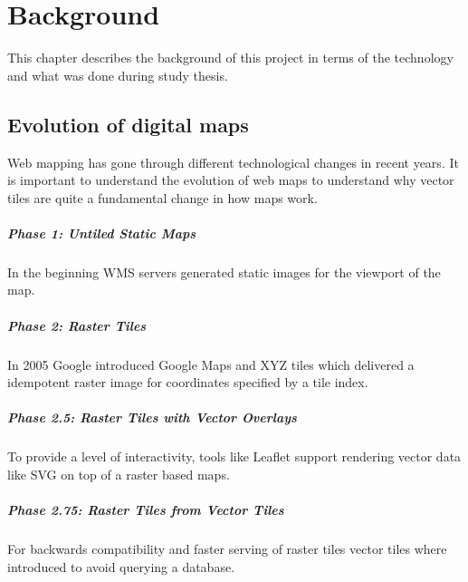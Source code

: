 \chapter{Background}

This chapter describes the background of this project in terms of the technology and what was done during study thesis.

\section{Evolution of digital maps}\label{part1_evolution_of_digital_maps}

Web mapping has gone through different technological changes in recent years. It is important to understand the evolution of web maps to understand why vector tiles are quite a fundamental change in how maps work.

\paragraph{Phase 1: Untiled Static
Maps}

In the beginning WMS servers generated static images for the viewport
of the map.

\paragraph{Phase 2: Raster Tiles}

In 2005 Google introduced Google Maps and XYZ 
tiles\cite{v_1_wiki.openstreetmap.org_2015}
which delivered a idempotent raster image for coordinates specified by a
tile index.

\paragraph{Phase 2.5: Raster Tiles with Vector
Overlays}

To provide a level of interactivity, tools like
Leaflet\cite{v_2_leafletjs.com_2015} support rendering vector
data like SVG on top of a raster based maps.

\paragraph{Phase 2.75: Raster Tiles from Vector
Tiles}

For backwards compatibility and faster serving of raster tiles vector
tiles where introduced to avoid querying a database.

